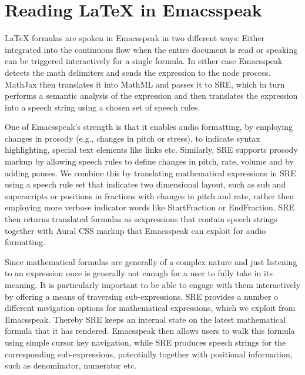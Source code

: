 \documentclass{sig-alternate}
\newcommand{\sre}{SRE\xspace}
\begin{document}
\section{Reading {\LaTeX} in Emacsspeak}
\label{sec:rendering}

{\LaTeX} formulas are spoken in Emacsspeak in two different ways: Either
integrated into the continuous flow when the entire document is read or
speaking can be triggered interactively for a single formula. In either case
Emacsspeak detects the math delimiters and sends the expression to the node
process. MathJax then translates it into MathML and passes it to \sre, which in
turn performs a semantic analysis of the expression and then translates the
expression into a speech string using a chosen set of speech rules.


One of Emacsspeak's strength is that it enables audio formatting, by employing
changes in prosody (e.g., changes in pitch or stress), to indicate syntax
highlighting, special text elements like links etc. Similarly, \sre supports
prosody markup by allowing speech rules to define changes in pitch, rate, volume
and by adding pauses. We combine this by translating mathematical expressions in
\sre using a speech rule set that indicates two dimensional layout, such as sub
and superscripts or positions in fractions with changes in pitch and rate,
rather then employing more verbose indicator words like StartFraction or
EndFraction. \sre then returns translated formulas as sexpressions that contain
speech strings together with Aural CSS markup that Emacsspeak can exploit for
audio formatting.


Since mathematical formulas are generally of a complex nature and just listening
to an expression once is generally not enough for a user to fully take in its
meaning.  It is particularly important to be able to engage with them
interactively by offering a means of traversing sub-expressions.  \sre provides
a number o different navigation options for mathematical expressions, which we
exploit from Emacsspeak. Thereby \sre keeps an internal state on the latest
mathematical formula that it has rendered. Emacsspeak then allows users to walk
this formula using simple cursor key navigation, while \sre produces speech
strings for the corresponding sub-expressions, potentially together with
positional information, such as denominator, numerator etc.
\end{document}

